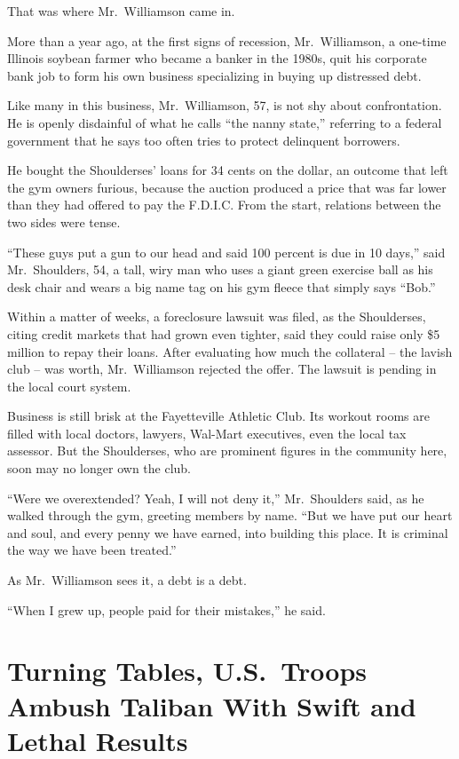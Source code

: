 \documentclass[12pt,a4paper,onecolumn]{article}
\begin{document}
That was where Mr.~Williamson came in.

More than a year ago, at the first signs of recession, Mr.~Williamson, a one-time Illinois soybean
farmer who became a banker in the 1980s, quit his corporate bank job to form his own business
specializing in buying up distressed debt.

Like many in this business, Mr.~Williamson, 57, is not shy about confrontation. He is openly
disdainful of what he calls ``the nanny state,'' referring to a federal government that he says too
often tries to protect delinquent borrowers.

He bought the Shoulderses' loans for 34 cents on the dollar, an outcome that left the gym owners
furious, because the auction produced a price that was far lower than they had offered to pay the
F.D.I.C. From the start, relations between the two sides were tense.

``These guys put a gun to our head and said 100 percent is due in 10 days,'' said Mr.~Shoulders, 54,
a tall, wiry man who uses a giant green exercise ball as his desk chair and wears a big name tag on
his gym fleece that simply says ``Bob.''

Within a matter of weeks, a foreclosure lawsuit was filed, as the Shoulderses, citing credit markets
that had grown even tighter, said they could raise only \$5 million to repay their loans. After
evaluating how much the collateral -- the lavish club -- was worth, Mr.~Williamson rejected the
offer. The lawsuit is pending in the local court system.

Business is still brisk at the Fayetteville Athletic Club. Its workout rooms are filled with local
doctors, lawyers, Wal-Mart executives, even the local tax assessor. But the Shoulderses, who are
prominent figures in the community here, soon may no longer own the club.

``Were we overextended? Yeah, I will not deny it,'' Mr.~Shoulders said, as he walked through the
gym, greeting members by name. ``But we have put our heart and soul, and every penny we have earned,
into building this place. It is criminal the way we have been treated.''

As Mr.~Williamson sees it, a debt is a debt.

``When I grew up, people paid for their mistakes,'' he said.

\section{Turning Tables, U.S.~Troops Ambush Taliban With Swift and Lethal Results}
\end{document}
